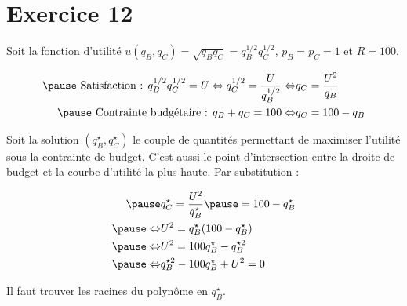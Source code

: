 \documentclass[9pt,professionalfonts,handout,hyperref]{beamer}
\begin{document}
\section{Exercice 12}

%

\begin{frame}

Soit la fonction d'utilité $u(q_B, q_C) = \sqrt{q_Bq_C} = q_B^{1/2}q_C^{1/2}$, $p_B = p_C = 1$ et $R=100$.

\[\begin{aligned}
\pause \text{ Satisfaction :   }q_B^{1/2}q_C^{1/2} = U \Leftrightarrow q_C^{1/2} = \frac{U}{q_B^{1/2}} \Leftrightarrow &q_C = \frac{U^2}{q_B} \\
\pause \text{ Contrainte budgétaire :   }q_B+q_C = 100 \Leftrightarrow &q_C = 100-q_B
\end{aligned}\]

\bigskip

\pause Soit la solution $(q_B^\star,q_C^\star)$ le couple de quantités permettant de maximiser l'utilité sous la contrainte de budget. \pause C'est aussi le point d'intersection entre la droite de budget et la courbe d'utilité la plus haute. \pause Par substitution :

\[\begin{aligned}
\pause &q_C^\star = \frac{U^2}{q_B^\star} \pause = 100-q_B^\star\\
\pause \Leftrightarrow&  U^2 = q_B^\star(100-q_B^\star) \\
\pause \Leftrightarrow&  U^2 = 100q_B^\star -q_B^{\star 2} \\
\pause \Leftrightarrow&  q_B^{\star 2} -100q_B^\star + U^2 = 0\\
\end{aligned}\]

\pause Il faut trouver les racines du polynôme en $q_B^\star$.

\end{frame}
\end{document}
